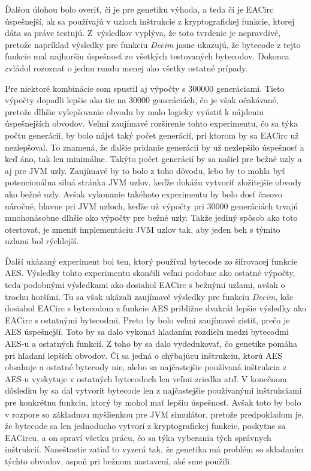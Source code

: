 Ďalšou úlohou bolo overiť, či je pre genetiku výhoda, a teda či je EACirc úspešnejší, ak sa používajú v uzloch inštrukcie z kryptografickej funkcie, ktorej dáta sa práve testujú. Z~výsledkov vyplýva, že toto tvrdenie je nepravdivé, pretože napríklad výsledky pre funkciu \textit{Decim} jasne ukazujú, že bytecode z tejto funkcie mal najhoršiu úspešnosť zo všetkých testovaných bytecodov. Dokonca zvládol rozoznať o jednu rundu menej ako všetky ostatné prípady.

Pre niektoré kombinácie som spustil aj výpočty s 300000 generáciami. Tieto výpočty dopadli lepšie ako tie na 30000 generáciách, čo je však očakávané, pretože dlhšie vylepšovanie obvodu by malo logicky vyústiť k nájdeniu úspešnejších obvodov. Veľmi zaujímavé rozšírenie tohto experimentu, čo sa týka počtu generácií, by bolo nájsť taký počet generácií, pri ktorom by sa EACirc už nezlepšoval. To znamená, že ďalšie pridanie generácií by už nezlepšilo úspešnosť a keď áno, tak len minimálne. Takýto počet generácií by sa našiel pre bežné uzly a aj pre JVM uzly. Zaujímavé by to bolo z toho dôvodu, lebo by to mohla byť potencionálna silná stránka JVM uzlov, keďže dokážu vytvoriť zložitejšie obvody ako bežné uzly. Avšak vykonanie takéhoto experimentu by bolo dosť časovo náročné, hlavne pri JVM uzloch, keďže už výpočty pri 30000 generáciách trvajú mnohonásobne dlhšie ako výpočty pre bežné uzly. Takže jediný spôsob ako toto otestovať, je zmeniť implementáciu JVM uzlov tak, aby jeden beh s týmito uzlami bol rýchlejší.

Ďalší ukázaný experiment bol ten, ktorý používal bytecode zo šifrovacej funkcie AES. Výsledky tohto experimentu skončili veľmi podobne ako ostatné výpočty, teda podobnými výsledkami ako dosiahol EACirc s bežnými uzlami, avšak o trochu horšími. Tu sa však ukázali zaujímavé výsledky pre funkciu \textit{Decim}, kde dosiahol EACirc s bytecodom z funkcie AES približne dvakrát lepšie výsledky ako EACirc s ostatnými bytecodmi. Preto by bolo veľmi zaujímavé zistiť, prečo je AES úspešnejší. Toto by sa dalo vykonať hľadaním rozdielu medzi bytecodmi AES-u a ostatných funkcií. Z toho by sa dalo vydedukovať, čo genetike pomáha pri hľadaní lepších obvodov. Či sa jedná o chýbajúcu inštrukciu, ktorú AES obsahuje a ostatné bytecody nie, alebo sa najčastejšie používaná inštrukcia z AES-u vyskytuje v ostatných bytecodoch len veľmi zriedka atď. V konečnom dôsledku by sa dal vytvoriť bytecode len z najčastejšie používanými inštrukciami pre konkrétnu funkciu, ktorý by mohol mať lepšiu úspešnosť. Avšak toto by bolo v rozpore so základnou myšlienkou pre JVM simulátor, pretože predpokladom je, že bytecode sa len jednoducho vytvorí z kryptografickej funkcie, poskytne sa EACircu, a on spraví všetku prácu, čo sa týka vyberania tých správnych inštrukcií. Naneštastie zatiaľ to vyzerá tak, že genetika má problém so skladaním týchto obvodov, aspoň pri bežnom nastavení, aké sme použili.

